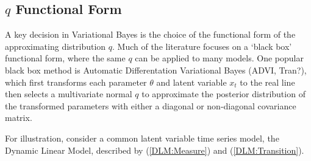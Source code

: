 \documentclass[12pt,a4paper]{article}%
\numberwithin{equation}{section}
\begin{document}
{{\subsection{$q$ Functional Form}
A key decision in Variational Bayes is the choice of the functional form of the approximating distribution $q$. Much of the literature focuses on a `black box' functional form, where the same $q$ can be applied to many models. One popular black box method is Automatic Differentation Variational Bayes (ADVI, Tran?), which first transforms each parameter $\theta$ and latent variable $x_t$ to the real line then selects a multivariate normal $q$ to approximate the posterior distribution of the transformed parameters with either a diagonal or non-diagonal covariance matrix.  

For illustration, consider a common latent variable time series model, the Dynamic Linear Model, described by (\ref{DLM:Measure}) and (\ref{DLM:Transition}).

}}
\end{document}
